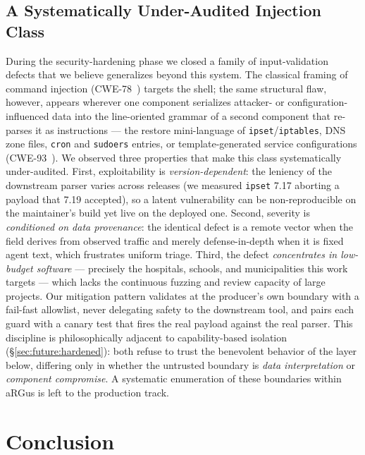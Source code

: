 \documentclass[11pt,a4paper]{article}
\begin{document}
    \subsection{A Systematically Under-Audited Injection Class}
    \label{sec:future:injection}
    During the security-hardening phase we closed a family of input-validation defects
    that we believe generalizes beyond this system. The classical framing of command
    injection (CWE-78~\cite{cwe78}) targets the shell; the same structural flaw, however,
    appears wherever one component serializes attacker- or configuration-influenced data
    into the line-oriented grammar of a second component that re-parses it as instructions
    --- the restore mini-language of \texttt{ipset}/\texttt{iptables}, DNS zone files,
    \texttt{cron} and \texttt{sudoers} entries, or template-generated service
    configurations (CWE-93~\cite{cwe93}). We observed three properties that make this class
    systematically under-audited. First, exploitability is \emph{version-dependent}: the
    leniency of the downstream parser varies across releases (we measured \texttt{ipset}
    7.17 aborting a payload that 7.19 accepted), so a latent vulnerability can be
    non-reproducible on the maintainer's build yet live on the deployed one. Second,
    severity is \emph{conditioned on data provenance}: the identical defect is a remote
    vector when the field derives from observed traffic and merely defense-in-depth when it
    is fixed agent text, which frustrates uniform triage. Third, the defect
    \emph{concentrates in low-budget software} --- precisely the hospitals, schools, and
    municipalities this work targets --- which lacks the continuous fuzzing and review
    capacity of large projects. Our mitigation pattern validates at the producer's own
    boundary with a fail-fast allowlist, never delegating safety to the downstream tool,
    and pairs each guard with a canary test that fires the real payload against the real
    parser. This discipline is philosophically adjacent to capability-based isolation
    (\S\ref{sec:future:hardened}): both refuse to trust the benevolent behavior of the
    layer below, differing only in whether the untrusted boundary is \emph{data
    interpretation} or \emph{component compromise}. A systematic enumeration of these
    boundaries within aRGus is left to the production track.

    \section{Conclusion}
\end{document}
